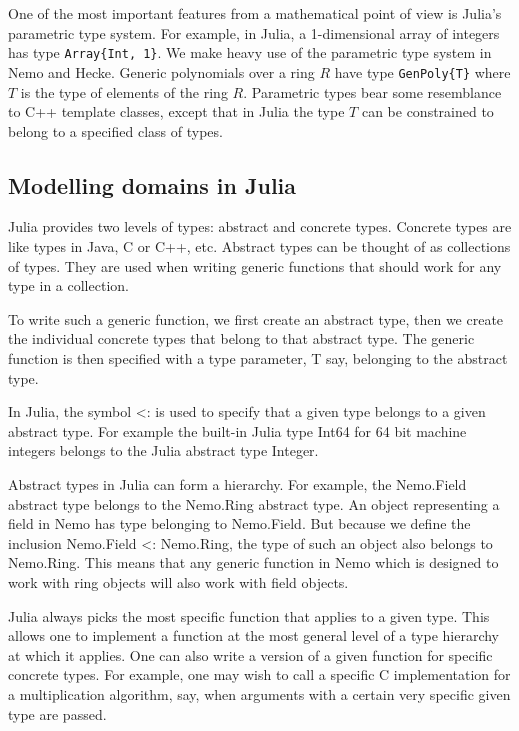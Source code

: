 \documentclass{sig-alternate-05-2015}
\begin{document}
One of the most important features from a mathematical point of view is Julia's parametric type system.
For example, in Julia, a 1-dimensional array of integers has type \texttt{Array\{Int, 1\}}.
We make heavy use of the parametric type system in Nemo and Hecke. Generic polynomials
over a ring $R$ have type \texttt{GenPoly\{T\}} where $T$ is the type of elements of the ring $R$.
Parametric types bear some resemblance to C++ template classes, except that in Julia the type $T$ can
be constrained to belong to a specified class of types.

\subsection{Modelling domains in Julia}

Julia provides two levels of types: abstract and concrete types.
Concrete types are like types in Java, C or C++,
etc. Abstract types can be thought of as collections of types. They are used when writing generic
functions that should work for any type in a collection.

To write such a generic function, we first create an abstract type, then we create the individual
concrete types that belong to that abstract type. The generic function is then specified with a type
parameter, T say, belonging to the abstract type.

In Julia, the symbol <: is used to specify that a given type belongs to a given abstract type.
For example the built-in Julia type Int64 for 64 bit machine integers belongs to the Julia
abstract type Integer.

Abstract types in Julia can form a hierarchy. For example, the Nemo.Field abstract type belongs
to the Nemo.Ring abstract type. An object representing a field in Nemo has type belonging to
Nemo.Field. But because we define the inclusion Nemo.Field <: Nemo.Ring, the type of such an
object also belongs to Nemo.Ring. This means that any generic function in Nemo which is designed
to work with ring objects will also work with field objects.

Julia always picks the most specific function that applies to a given type. This allows one to
implement a function at the most general level of a type hierarchy at which it applies. One can
also write a version of a given function for specific concrete types. For example, one may wish
to call a specific C implementation for a multiplication algorithm, say, when arguments with a
certain very specific given type are passed.
\end{document}
